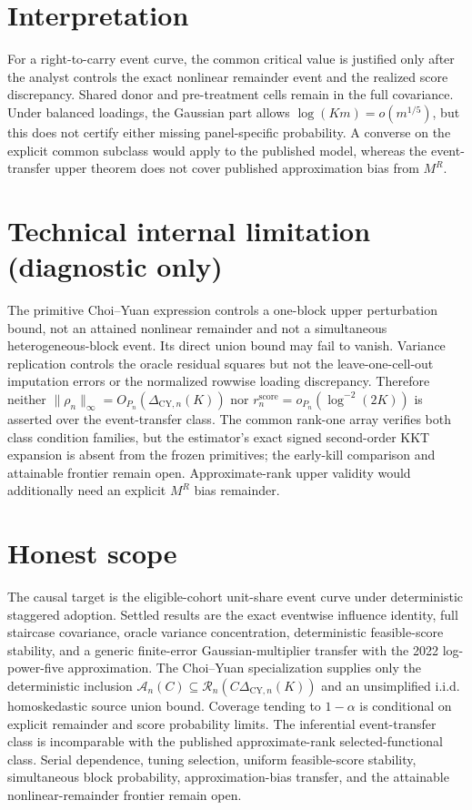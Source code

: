 \documentclass{article}
\begin{document}
\section{Interpretation}

For a right-to-carry event curve, the common critical value is justified only after the analyst controls the exact nonlinear remainder event and the realized score discrepancy.  Shared donor and pre-treatment cells remain in the full covariance.  Under balanced loadings, the Gaussian part allows \(\log(Km)=o(m^{1/5})\), but this does not certify either missing panel-specific probability.  A converse on the explicit common subclass would apply to the published model, whereas the event-transfer upper theorem does not cover published approximation bias from \(M^R\).

\section*{Technical internal limitation (diagnostic only)}

The primitive Choi--Yuan expression controls a one-block upper perturbation bound, not an attained nonlinear remainder and not a simultaneous heterogeneous-block event.  Its direct union bound may fail to vanish.  Variance replication controls the oracle residual squares but not the leave-one-cell-out imputation errors or the normalized rowwise loading discrepancy.  Therefore neither \(\|\rho_n\|_\infty=O_{P_n}(\Delta_{\mathrm{CY},n}(K))\) nor \(r_n^{\mathrm{score}}=o_{P_n}(\log^{-2}(2K))\) is asserted over the event-transfer class.  The common rank-one array verifies both class condition families, but the estimator's exact signed second-order KKT expansion is absent from the frozen primitives; the early-kill comparison and attainable frontier remain open.  Approximate-rank upper validity would additionally need an explicit \(M^R\) bias remainder.

\section{Honest scope}

The causal target is the eligible-cohort unit-share event curve under deterministic staggered adoption.  Settled results are the exact eventwise influence identity, full staircase covariance, oracle variance concentration, deterministic feasible-score stability, and a generic finite-error Gaussian-multiplier transfer with the 2022 log-power-five approximation.  The Choi--Yuan specialization supplies only the deterministic inclusion \(\mathcal A_n(C)\subseteq\mathcal R_n(C\Delta_{\mathrm{CY},n}(K))\) and an unsimplified i.i.d. homoskedastic source union bound.  Coverage tending to \(1-\alpha\) is conditional on explicit remainder and score probability limits.  The inferential event-transfer class is incomparable with the published approximate-rank selected-functional class.  Serial dependence, tuning selection, uniform feasible-score stability, simultaneous block probability, approximation-bias transfer, and the attainable nonlinear-remainder frontier remain open.
\end{document}
